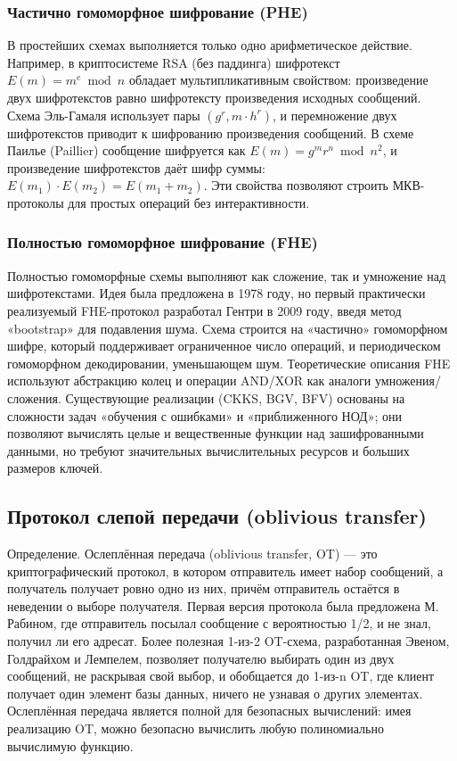 \subsubsection{Частично гомоморфное шифрование (PHE)}

В простейших схемах выполняется только одно арифметическое действие.  Например, в криптосистеме RSA (без паддинга) шифротекст \(E(m) = m^e \bmod n\) обладает мультипликативным свойством: произведение двух шифротекстов равно шифротексту произведения исходных сообщений.  Схема Эль-Гамаля использует пары \((g^r, m \cdot h^r)\), и перемножение двух шифротекстов приводит к шифрованию произведения сообщений.  В схеме Паилье (Paillier) сообщение шифруется как \(E(m) = g^m r^n \bmod n^2\), и произведение шифротекстов даёт шифр суммы: \(E(m_1)\cdot E(m_2) = E(m_1 + m_2)\).  Эти свойства позволяют строить МКВ-протоколы для простых операций без интерактивности.

\subsubsection{Полностью гомоморфное шифрование (FHE)}

Полностью гомоморфные схемы выполняют как сложение, так и умножение над шифротекстами.  Идея была предложена в 1978 году, но первый практически реализуемый FHE-протокол разработал Гентри в 2009 году, введя метод «bootstrap» для подавления шума.  Схема строится на «частично» гомоморфном шифре, который поддерживает ограниченное число операций, и периодическом гомоморфном декодировании, уменьшающем шум.  Теоретические описания FHE используют абстракцию колец и операции AND/XOR как аналоги умножения/сложения.  Существующие реализации (CKKS, BGV, BFV) основаны на сложности задач «обучения с ошибками» и «приближенного НОД»; они позволяют вычислять целые и вещественные функции над зашифрованными данными, но требуют значительных вычислительных ресурсов и больших размеров ключей.

\subsection{Протокол слепой передачи (oblivious transfer)}

Определение.  Ослеплённая передача (oblivious transfer, OT) --- это криптографический протокол, в котором отправитель имеет набор сообщений, а получатель получает ровно одно из них, причём отправитель остаётся в неведении о выборе получателя.  Первая версия протокола была предложена М. Рабином, где отправитель посылал сообщение с вероятностью 1/2, и не знал, получил ли его адресат.  Более полезная 1-из-2 OT-схема, разработанная Эвеном, Голдрайхом и Лемпелем, позволяет получателю выбирать один из двух сообщений, не раскрывая свой выбор, и обобщается до 1-из-n OT, где клиент получает один элемент базы данных, ничего не узнавая о других элементах.  Ослеплённая передача является полной для безопасных вычислений: имея реализацию OT, можно безопасно вычислить любую полиномиально вычислимую функцию.

